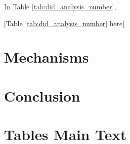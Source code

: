 In Table \ref{tab:did_analysis_number}, 

\begin{center}
    [Table \ref{tab:did_analysis_number} here]
\end{center}

\section{Mechanisms}







\section{Conclusion}




\clearpage

\appendix

\section{Tables Main Text}


\clearpage


\clearpage


\clearpage

